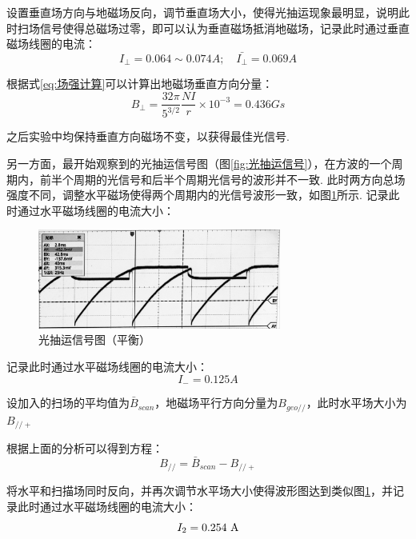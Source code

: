 \documentclass[10pt,hyperref,a4paper,UTF8]{ctexart}
\newcommand{\pll}{/\!/}
\begin{document}
                设置垂直场方向与地磁场反向，调节垂直场大小，使得光抽运现象最明显，说明此时扫场信号使得总磁场过零，即可以认为垂直磁场抵消地磁场，记录此时通过垂直磁场线圈的电流：
                $$
                        I_{\perp}=0.064 \sim 0.074\unit{A} ;\quad \bar{I_{\perp}}=0.069\unit{A}
                $$

                根据式\ref{eq:场强计算}可以计算出地磁场垂直方向分量：
                        \begin{equation*}
                        B_{\perp}=\frac{32\pi}{5^{3/2}}\frac{NI}{r}\times 10^{-3}=0.436\unit{Gs}
                        \end{equation*}

                之后实验中均保持垂直方向磁场不变，以获得最佳光信号. 

                另一方面，最开始观察到的光抽运信号图（图\ref{fig:光抽运信号}），在方波的一个周期内，前半个周期的光信号和后半个周期光信号的波形并不一致. 此时两方向总场强度不同，调整水平磁场使得两个周期内的光信号波形一致，如图\ref{fig:光抽运信号(平衡)}所示. 记录此时通过水平磁场线圈的电流大小：
                        \begin{figure}[htbp]\label{fig:光抽运信号(平衡)}
                                \centering
                                \includegraphics[width=8cm]{figures/IMAGE 2024-11-22 01:28:40.jpg}
                                \caption{光抽运信号图（平衡）}
                        \end{figure}

                记录此时通过水平磁场线圈的电流大小：
                        $$I_{-}=0.125\unit{A}$$

                设加入的扫场的平均值为$\bar{B}_{scan}$，地磁场平行方向分量为$B_{geo\pll}$，此时水平场大小为$B_{\pll +}$

                根据上面的分析可以得到方程：
                        \begin{equation}\label{eq:地磁场平行方向分量1}
                                B_{\pll}=\bar{B}_{scan}-B_{\pll +}
                        \end{equation}

                将水平和扫描场同时反向，并再次调节水平场大小使得波形图达到类似图\ref{fig:光抽运信号(平衡)}，并记录此时通过水平磁场线圈的电流大小：
                        \begin{equation*}
                                I_{2}=0.254\ \rm A
                        \end{equation*}
\end{document}
